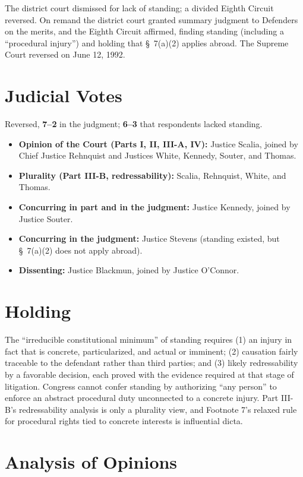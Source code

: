 \documentclass[12pt]{article}
\begin{document}
The district court dismissed for lack of standing; a divided Eighth Circuit reversed. On remand the district court granted summary judgment to Defenders on the merits, and the Eighth Circuit affirmed, finding standing (including a ``procedural injury'') and holding that \S~7(a)(2) applies abroad. The Supreme Court reversed on June 12, 1992.

\section{Judicial Votes}

Reversed, \textbf{7--2} in the judgment; \textbf{6--3} that respondents lacked standing.
\begin{itemize}
\item \textbf{Opinion of the Court (Parts I, II, III-A, IV):} Justice Scalia, joined by Chief Justice Rehnquist and Justices White, Kennedy, Souter, and Thomas.
\item \textbf{Plurality (Part III-B, redressability):} Scalia, Rehnquist, White, and Thomas.
\item \textbf{Concurring in part and in the judgment:} Justice Kennedy, joined by Justice Souter.
\item \textbf{Concurring in the judgment:} Justice Stevens (standing existed, but \S~7(a)(2) does not apply abroad).
\item \textbf{Dissenting:} Justice Blackmun, joined by Justice O'Connor.
\end{itemize}

\section{Holding}

The ``irreducible constitutional minimum'' of standing requires (1) an injury in fact that is concrete, particularized, and actual or imminent; (2) causation fairly traceable to the defendant rather than third parties; and (3) likely redressability by a favorable decision, each proved with the evidence required at that stage of litigation. Congress cannot confer standing by authorizing ``any person'' to enforce an abstract procedural duty unconnected to a concrete injury. Part III-B's redressability analysis is only a plurality view, and Footnote 7's relaxed rule for procedural rights tied to concrete interests is influential dicta.

\section{Analysis of Opinions}
\end{document}
